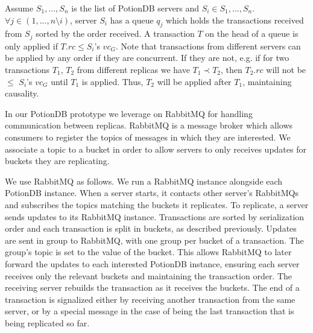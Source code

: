 \documentclass{vldb}
\begin{document}
Assume $S_1, ..., S_n$ is the list of PotionDB servers and $S_i \in S_1, ..., S_n$.
$\forall j \in (1, ..., n \setminus i)$, server $S_i$ has a queue $q_j$ which holds the transactions received from $S_j$ sorted by the order received.
A transaction $T$ on the head of a queue is only applied if $T.rc \leq S_i$'s $vc_G$.
Note that transactions from different servers can be applied by any order if they are concurrent. 
If they are not, e.g. if for two transactions $T_1$, $T_2$ from different replicas we have $T_1 \prec T_2$, then $T_2.rc$ will not be $\leq$ $S_i$'s $vc_G$ until $T_1$ is applied.
Thus, $T_2$ will be applied after $T_1$, maintaining causality. %

In our PotionDB prototype we leverage on RabbitMQ \cite{???} for handling communication between replicas.
RabbitMQ is a message broker which allows consumers to register the topics of messages in which they are interested.
We associate a topic to a bucket in order to allow servers to only receives updates for buckets they are replicating.

We use RabbitMQ as follows. We run a RabbitMQ instance alongside each PotionDB instance.
When a server starts, it contacts other server's RabbitMQs and subscribes the topics matching the buckets it replicates.
To replicate, a server sends updates to its RabbitMQ instance.
Transactions are sorted by serialization order and each transaction is split in buckets, as described previously.
Updates are sent in group to RabbitMQ, with one group per bucket of a transaction.
The group's topic is set to the value of the bucket.
This allows RabbitMQ to later forward the updates to each interested PotionDB instance, ensuring each server receives only the relevant buckets and maintaining the transaction order.
The receiving server rebuilds the transaction as it receives the buckets.
The end of a transaction is signalized either by receiving another transaction from the same server, or by a special message in the case of being the last transaction that is being replicated so far.

\end{document}
